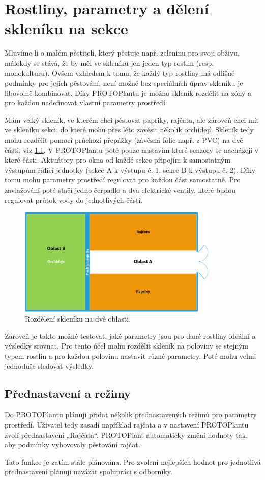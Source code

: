 \chapter{Rostliny, parametry a dělení skleníku na sekce}
Mluvíme-li o malém pěstiteli, který pěstuje např. zeleninu pro svoji obživu, málokdy se stává, že by měl ve skleníku jen jeden typ rostlin (resp. monokulturu).
Ovšem vzhledem k tomu, že každý typ rostliny má odlišné podmínky pro jejich pěstování, není možné bez speciálních úprav skleníku je libovolně kombinovat.
Díky PROTOPlantu je možno skleník rozdělit na zóny a pro každou nadefinovat vlastní parametry prostředí.
\newline

\noindent{}

Mám velký skleník, ve kterém chci pěstovat papriky, rajčata, ale zároveň chci mít ve skleníku sekci, do které mohu přes léto zavěsit několik orchidejí.
Skleník tedy mohu rozdělit pomocí průchozí přepážky (závěsná fólie např. z PVC) na dvě části, viz \ref{fig:separationA}.
V PROTOPlantu poté pouze nastavím které senzory se nacházejí v které části.
Aktuátory pro okna od každé sekce připojím k samostatným výstupům řídící jednotky (sekce A k výstupu č. 1, sekce B k výstupu č. 2).
Díky tomu mohu parametry prostředí regulovat pro každou část samostatně.
Pro zavlažování poté stačí jedno čerpadlo a dva elektrické ventily, které budou regulovat průtok vody do jednotlivých částí.
\begin{figure}[htbp]
    \centering
    \includegraphics[width=0.85\textwidth]{img/Rozdeleni_Skleniku_A.png}
    \caption{Rozdělení skleníku na dvě oblasti.}
    \label{fig:separationA}
\end{figure}

Zároveň je takto možné testovat, jaké parametry jsou pro dané rostliny ideální a výsledky srovnat.
Pro tento účel mohu rozdělit skleník na poloviny se stejným typem rostlin a pro každou polovinu nastavit různé parametry.
Poté mohu velmi jednoduše sledovat výsledky.

\section{Přednastavení a režimy}
Do PROTOPlantu plánuji přidat několik přednastavených režimů pro parametry prostředí.
Uživatel tedy zasadí například rajčata a v nastavení PROTOPlantu zvolí přednastavení „Rajčata“.
PROTOPlant automaticky změní hodnoty tak, aby podmínky vyhovovaly pěstování rajčat.

Tato funkce je zatím stále plánována.
Pro zvolení nejlepších hodnot pro jednotlivá přednastavení plánuji navázat spolupráci s odborníky.

\newpage